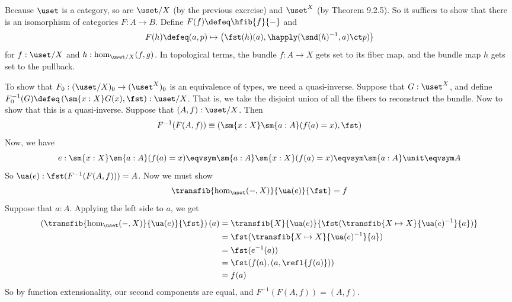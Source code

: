  \soln
Because $\uset$ is a category, so are $\uset/X$ (by the previous exercise) and
$\uset^{X}$ (by Theorem 9.2.5).  So it suffices to show that there is an
isomorphism of categories $F : A \to B$.  Define $F(f) \defeq \hfib{f}{-}$ and
\begin{align*}
  F(h) \defeq (a, p) \mapsto \left(\fst(h)(a), \happly(\snd(h)^{-1},a) \ct
  p)\right) 
\end{align*}
for $f : \uset/X$ and $h : \hom_{\uset/X}(f, g)$.  In topological terms, the
bundle $f : A \to X$ gets set to its fiber map, and the bundle map $h$ gets set
to the pullback.  


To show that $F_{0} : (\uset/X)_{0} \to (\uset^{X})_{0}$ is an equivalence of
types, we need a quasi-inverse.  Suppose that $G : \uset^{X}$, and define
$F^{-1}_{0}(G) \defeq \left(\sm{x:X}G(x), \fst\right) : \uset/X$.  That is, we
take the disjoint union of all the fibers to reconstruct the bundle.  Now to
show that this is a quasi-inverse.  Suppose that $(A, f) : \uset/X$.  Then
\[
  F^{-1}(F(A, f)) 
  \equiv \left(\sm{x:X}\sm{a:A}(f(a) = x), \fst\right)
\]
Now, we have
\[
  e : 
  \sm{x:X} \sm{a:A} (f(a) = x)
  \eqvsym
  \sm{a:A} \sm{x:X} (f(a) = x)
  \eqvsym
  \sm{a:A} \unit
  \eqvsym
  A
\]
So $\ua(e) : \fst(F^{-1}(F(A, f))) = A$.  Now we must show
\[
  \transfib{\hom_{\uset}(-, X)}{\ua(e)}{\fst} = f
\]                      
Suppose that $a:A$.  Applying the left side to $a$, we get
\begin{align*}
  \left(\transfib{\hom_{\uset}(-,X)}{\ua(e)}{\fst}\right)(a)
  &=
  \transfib{X}{\ua(e)}{\fst(\transfib{X \mapsto X}{\ua(e)^{-1}}{a})}
  \\&=
  \fst(\transfib{X \mapsto X}{\ua(e)^{-1}}{a})
  \\&=
  \fst(e^{-1}(a))
  \\&=
  \fst(f(a), (a, \refl{f(a)}))
  \\&=
  f(a)
\end{align*}
So by function extensionality, our second components are equal, and
$F^{-1}(F(A, f)) = (A, f)$.


